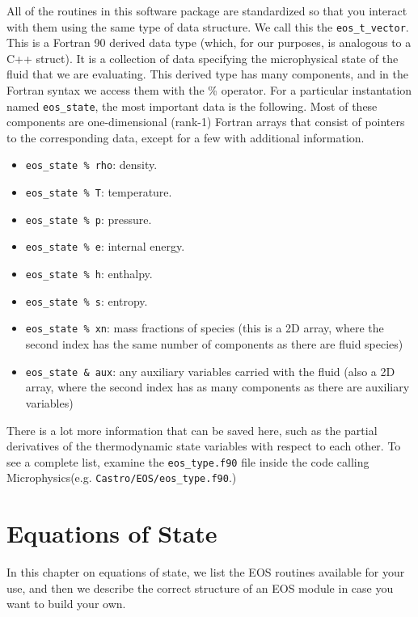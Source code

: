 \documentclass[11pt]{book}
\newcommand{\microphysics}{{\sf Microphysics}}
\begin{document}
All of the routines in this software package are standardized so that you interact with them 
using the same type of data structure. We call this the {\tt eos\_t\_vector}. This is a 
Fortran 90 derived data type (which, for our purposes, is analogous to a C++ struct). It is 
a collection of data specifying the microphysical state of the fluid that we are evaluating. 
This derived type has many components, and in the Fortran syntax we access them with the 
\% operator. For a particular instantation named {\tt eos\_state}, the most important data is 
the following. Most of these components are one-dimensional (rank-1) Fortran arrays that 
consist of pointers to the corresponding data, except for a few with additional information.
\begin{itemize}
  \item {\tt eos\_state \% rho}: density.
  \item {\tt eos\_state \% T}: temperature.
  \item {\tt eos\_state \% p}: pressure.
  \item {\tt eos\_state \% e}: internal energy.
  \item {\tt eos\_state \% h}: enthalpy.
  \item {\tt eos\_state \% s}: entropy.
  \item {\tt eos\_state \% xn}: mass fractions of species (this is a 2D array, where the second 
                                index has the same number of components as there are fluid species)
  \item {\tt eos\_state \& aux}: any auxiliary variables carried with the fluid (also a 2D array, where
                                 the second index has as many components as there are auxiliary variables)
\end{itemize}
There is a lot more information that can be saved here, such as the partial derivatives of the 
thermodynamic state variables with respect to each other. To see a complete list, examine the 
{\tt eos\_type.f90} file inside the code calling \microphysics (e.g. {\tt Castro/EOS/eos\_type.f90}.)

\chapter{Equations of State}

In this chapter on equations of state, we list the EOS routines available for your use, and 
then we describe the correct structure of an EOS module in case you want to build your own.
\end{document}
